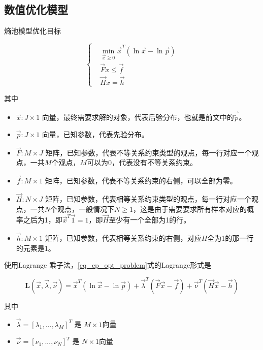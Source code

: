 \subsection{数值优化模型}

熵池模型优化目标

\begin{equation}\label{eq_ep_opt_problem}
    \left\{
    \begin{aligned}
         & \min_{\vec{x} \geq 0}\vec{x}^T(\ln\vec{x}-\ln\vec{p}) \\
         & \vec{F}x \leq \vec{f}                                 \\
         & \vec{H}x = \vec{h}
    \end{aligned}
    \right.
\end{equation}

其中

\begin{itemize}
    \item $\vec{x}: J\times 1$ 向量，最终需要求解的对象，代表后验分布，也就是前文中的$\vec{\tilde{p}}$。
    \item $\vec{p}: J\times 1$ 向量，已知参数，代表先验分布。
    \item $\vec{F}: M\times J$ 矩阵，已知参数，代表不等关系约束类型的观点，每一行对应一个观点，一共$M$个观点，$M$可以为0，代表没有不等关系约束。
    \item $\vec{f}: M\times 1$ 矩阵，已知参数，代表不等关系约束的右侧，可以全部为零。
    \item $\vec{H}: N\times J$ 矩阵，已知参数，代表相等关系约束类型的观点，每一行对应一个观点，一共$N$个观点，一般情况下$N\geq1$，这是由于需要要求所有样本对应的概率之后为1，即$\vec{x}^T\vec{1}=1$，即$\vec{H}$至少有一个全部为1的行。
    \item $\vec{h}: M\times 1$ 矩阵，已知参数，代表相等关系约束的右侧，对应$H$全为1的那一行的元素是1。
\end{itemize}

使用Lagrange 乘子法，\ref{eq_ep_opt_problem}式的Lagrange形式是

\begin{equation}\label{eq_ep_opt_lagrange}
    \mathbf{L}(\vec{x}, \vec{\lambda}, \vec{\nu}) = \vec{x}^T(\ln\vec{x}-\ln\vec{p}) + \vec{\lambda}^T(\vec{F}\vec{x}-\vec{f}) + \vec{\nu}^T(\vec{H}\vec{x}-\vec{h})
\end{equation}

其中
\begin{itemize}
    \item $\vec{\lambda} = [\lambda_1,...,\lambda_M]^T$ 是 $M\times 1$向量
    \item $\vec{\nu} = [\nu_1,...,\nu_N]^T$ 是 $N\times 1$向量
\end{itemize}

